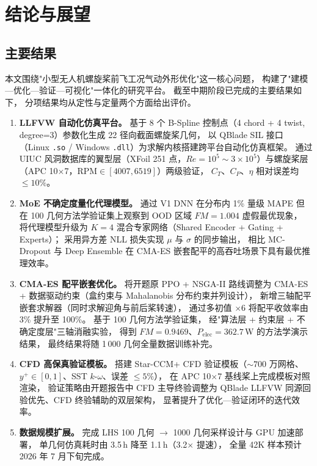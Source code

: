 
\chapter*{结论与展望}

\section*{主要结果}

本文围绕"小型无人机螺旋桨前飞工况气动外形优化"这一核心问题，
构建了"建模—优化—验证—可视化"一体化的研究平台。
截至中期阶段已完成的主要结果如下，
分项结果均从定性与定量两个方面给出评价。

\begin{enumerate}
  \item \textbf{LLFVW 自动化仿真平台。}
        基于 8 个 B-Spline 控制点（4 chord + 4 twist, degree=3）参数化生成 22 径向截面螺旋桨几何，
        以 QBlade SIL 接口（Linux \texttt{.so} / Windows \texttt{.dll}）为求解内核搭建跨平台自动化仿真框架。
        通过 UIUC 风洞数据库的翼型层（XFoil 251 点，$Re=10^5\sim 3\times 10^5$）与螺旋桨层
        （APC 10$\times$7，$\text{RPM}\in[4007,6519]$）两级验证，
        $C_T$、$C_P$、$\eta$ 相对误差均 $\leq 10\%$。

  \item \textbf{MoE 不确定度量化代理模型。}
        通过 V1 DNN 在分布内 1\% 量级 MAPE 但在 100 几何方法学验证集上观察到 OOD 区域 $FM=1.004$ 虚假最优现象，
        将代理模型升级为 $K=4$ 混合专家网络（Shared Encoder + Gating + Experts）；
        采用异方差 NLL 损失实现 $\mu$ 与 $\sigma$ 的同步输出，
        相比 MC-Dropout 与 Deep Ensemble 在 CMA-ES 嵌套配平的高吞吐场景下具有最优推理效率。

  \item \textbf{CMA-ES 配平嵌套优化。}
        将开题原 PPO + NSGA-II 路线调整为 CMA-ES + 数据驱动约束（盒约束与 Mahalanobis 分布约束并列设计），
        新增三轴配平嵌套求解器（同时求解迎角与前后桨转速），
        通过多初值 $\times 6$ 将配平收敛率由 3\% 提升至 100\%。
        基于 100 几何方法学验证集，
        经"算法层 + 约束层 + 不确定度层"三轴消融实验，
        得到 $FM=0.9469$、$P_{\text{elec}}=362.7$\,W 的方法学演示结果，
        最终结果将随 1\,000 几何全量数据训练补完。

  \item \textbf{CFD 高保真验证模板。}
        搭建 Star-CCM+ CFD 验证模板（$\sim 700$ 万网格、$y^+ \in [0,1]$、SST $k$-$\omega$、误差 $\leq 5\%$），
        在 APC 10$\times$7 基线桨上完成模板对照渲染，
        验证策略由开题报告中 CFD 主导终验调整为 QBlade LLFVW 同源回验优先、CFD 终验辅助的双层架构，
        显著提升了优化—验证闭环的迭代效率。

  \item \textbf{数据规模扩展。}
        完成 LHS 100 几何 $\to$ 1000 几何采样设计与 GPU 加速部署，
        单几何仿真耗时由 3.5\,h 降至 1.1\,h（3.2$\times$ 提速），
        全量 42K 样本预计 2026 年 7 月下旬完成。
\end{enumerate}

